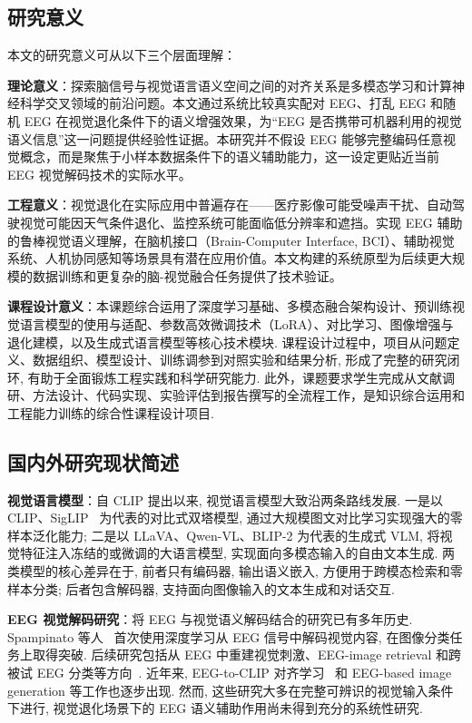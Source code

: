 \subsection{研究意义}

本文的研究意义可从以下三个层面理解：

\textbf{理论意义}：探索脑信号与视觉语言语义空间之间的对齐关系是多模态学习和计算神经科学交叉领域的前沿问题。本文通过系统比较真实配对 EEG、打乱 EEG 和随机 EEG 在视觉退化条件下的语义增强效果，为``EEG 是否携带可机器利用的视觉语义信息''这一问题提供经验性证据。本研究并不假设 EEG 能够完整编码任意视觉概念，而是聚焦于小样本数据条件下的语义辅助能力，这一设定更贴近当前 EEG 视觉解码技术的实际水平。

\textbf{工程意义}：视觉退化在实际应用中普遍存在——医疗影像可能受噪声干扰、自动驾驶视觉可能因天气条件退化、监控系统可能面临低分辨率和遮挡。实现 EEG 辅助的鲁棒视觉语义理解，在脑机接口（Brain-Computer Interface, BCI）、辅助视觉系统、人机协同感知等场景具有潜在应用价值。本文构建的系统原型为后续更大规模的数据训练和更复杂的脑-视觉融合任务提供了技术验证。

\textbf{课程设计意义}：本课题综合运用了深度学习基础、多模态融合架构设计、预训练视觉语言模型的使用与适配、参数高效微调技术（LoRA）、对比学习、图像增强与退化建模，以及生成式语言模型等核心技术模块. 课程设计过程中，项目从问题定义、数据组织、模型设计、训练调参到对照实验和结果分析, 形成了完整的研究闭环, 有助于全面锻炼工程实践和科学研究能力. 此外，课题要求学生完成从文献调研、方法设计、代码实现、实验评估到报告撰写的全流程工作，是知识综合运用和工程能力训练的综合性课程设计项目.

\subsection{国内外研究现状简述}

\textbf{视觉语言模型}：自 CLIP 提出以来, 视觉语言模型大致沿两条路线发展. 一是以 CLIP、SigLIP~\cite{zhai2023sigmoid} 为代表的对比式双塔模型, 通过大规模图文对比学习实现强大的零样本泛化能力; 二是以 LLaVA、Qwen-VL、BLIP-2 为代表的生成式 VLM, 将视觉特征注入冻结的或微调的大语言模型, 实现面向多模态输入的自由文本生成. 两类模型的核心差异在于, 前者只有编码器, 输出语义嵌入, 方便用于跨模态检索和零样本分类; 后者包含解码器, 支持面向图像输入的文本生成和对话交互.

\textbf{EEG 视觉解码研究}：将 EEG 与视觉语义解码结合的研究已有多年历史. Spampinato 等人~\cite{spampinato2017deep} 首次使用深度学习从 EEG 信号中解码视觉内容, 在图像分类任务上取得突破. 后续研究包括从 EEG 中重建视觉刺激、EEG-image retrieval 和跨被试 EEG 分类等方向~\cite{palazzo2017decoding,tirupattur2018thoughtviz}. 近年来, EEG-to-CLIP 对齐学习~\cite{du2023eegclip} 和 EEG-based image generation 等工作也逐步出现. 然而, 这些研究大多在完整可辨识的视觉输入条件下进行, 视觉退化场景下的 EEG 语义辅助作用尚未得到充分的系统性研究.

